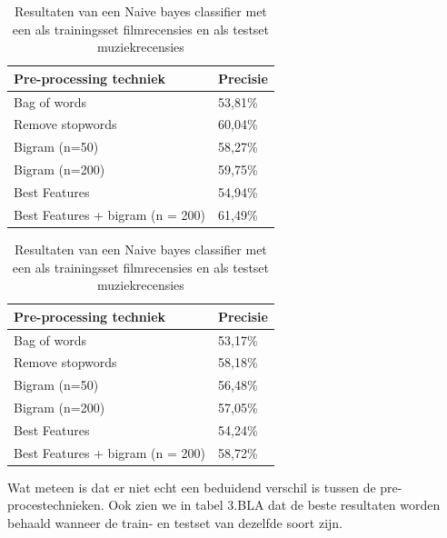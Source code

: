 \begin{table}[h]
\centering
\setlength\tabcolsep{4pt}
\begin{minipage}{0.48\textwidth}
\centering
\begin{tabular}{|l|l|}
\hline
\textbf{Pre-processing techniek} & \textbf{Precisie}\\ \hline
Bag of words                     & 53,81\%          \\ \hline
Remove stopwords                 & 60,04\%          \\  \hline
Bigram (n=50)                    & 58,27\%          \\  \hline
Bigram (n=200)                   & 59,75\%          \\  \hline
Best Features                    & 54,94\%          \\  \hline
Best Features + bigram (n = 200) & 61,49\%          \\    \hline
\end{tabular}
\caption{Resultaten van een Naive bayes classifier met een als trainingsset filmrecensies en als testset boekrecensies}
\label{tab:accuracy}
\end{minipage}%
\hfill
\begin{minipage}{0.48\textwidth}
\centering
\begin{tabular}{|l|l|}
\hline
\textbf{Pre-processing techniek} & \textbf{Precisie}\\ \hline
Bag of words                     & 53,17\%          \\ \hline
Remove stopwords                 & 58,18\%          \\ \hline
Bigram (n=50)                    & 56,48\%          \\ \hline
Bigram (n=200)                   & 57,05\%          \\ \hline
Best Features                    & 54,24\%          \\ \hline
Best Features + bigram (n = 200) & 58,72\%          \\    \hline
\end{tabular}
 \caption{Resultaten van een Naive bayes classifier met een als trainingsset filmrecensies en als testset muziekrecensies} 
 \label{tab:ompdiff} 
\end{minipage}
\end{table}

Wat meteen is dat er niet echt een beduidend verschil is tussen de pre-procestechnieken. Ook zien we in tabel 3.BLA dat de beste resultaten worden behaald wanneer de train- en testset van dezelfde soort zijn. \\

